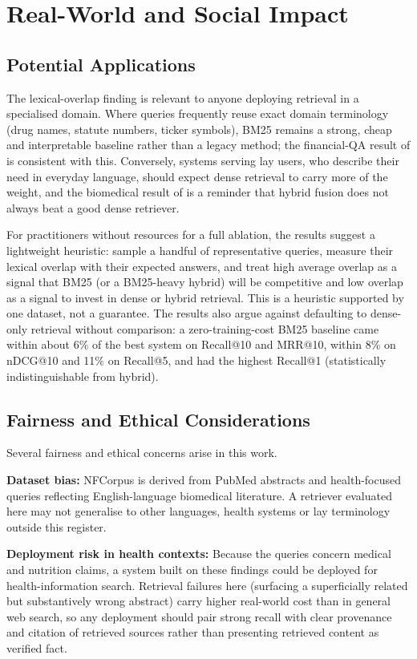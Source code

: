 \documentclass[10pt,letterpaper,twocolumn]{article}
\begin{document}
\section{Real-World and Social Impact}
\subsection{Potential Applications}
The lexical-overlap finding is relevant to anyone deploying retrieval in a specialised domain. Where queries frequently reuse exact domain terminology (drug names, statute numbers, ticker symbols), BM25 remains a strong, cheap and interpretable baseline rather than a legacy method; the financial-QA result of \citet{akarsu2026} is consistent with this. Conversely, systems serving lay users, who describe their need in everyday language, should expect dense retrieval to carry more of the weight, and the biomedical result of \citet{bal2026} is a reminder that hybrid fusion does not always beat a good dense retriever.

For practitioners without resources for a full ablation, the results suggest a lightweight heuristic: sample a handful of representative queries, measure their lexical overlap with their expected answers, and treat high average overlap as a signal that BM25 (or a BM25-heavy hybrid) will be competitive and low overlap as a signal to invest in dense or hybrid retrieval. This is a heuristic supported by one dataset, not a guarantee. The results also argue against defaulting to dense-only retrieval without comparison: a zero-training-cost BM25 baseline came within about 6\% of the best system on Recall@10 and MRR@10, within 8\% on nDCG@10 and 11\% on Recall@5, and had the highest Recall@1 (statistically indistinguishable from hybrid).

\subsection{Fairness and Ethical Considerations}
Several fairness and ethical concerns arise in this work.

\textbf{Dataset bias:} NFCorpus is derived from PubMed abstracts and health-focused queries reflecting English-language biomedical literature. A retriever evaluated here may not generalise to other languages, health systems or lay terminology outside this register.

\textbf{Deployment risk in health contexts:} Because the queries concern medical and nutrition claims, a system built on these findings could be deployed for health-information search. Retrieval failures here (surfacing a superficially related but substantively wrong abstract) carry higher real-world cost than in general web search, so any deployment should pair strong recall with clear provenance and citation of retrieved sources rather than presenting retrieved content as verified fact.
\end{document}
